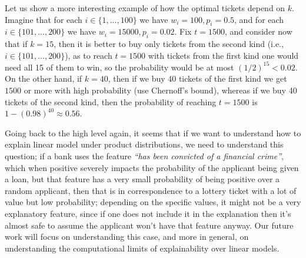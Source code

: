 Let us show a more interesting example of how the optimal tickets depend on $k$.
Imagine that for each $i \in \{1, ..., 100\}$ we have $w_i = 100, p_i = 0.5$, and for each $i \in \{101, ..., 200\}$ we have $w_i = 15000, p_i = 0.02$. Fix $t = 1500$, and consider now that if $k = 15$, then it is better to buy only tickets from the second kind (i.e., $i \in \{101, \ldots, 200\}$), as to reach $t=1500$ with tickets from the first kind one would need all 15 of them to win, so the probability would be at most $(1/2)^{15} < 0.02$.  On the other hand, if $k = 40$, then if we buy 40 tickets of the first kind we get $1500$ or more with high probability (use Chernoff's bound), whereas if we buy 40 tickets of the second kind, then the probability of reaching $t = 1500$ is $1 - (0.98)^{40} \approx 0.56$.

Going back to the high level again, it seems that if we want to understand how to explain linear model under product distributions, we need to understand this question; if a bank uses the feature \emph{``has been convicted of a financial crime''}, which when positive severely impacts the probability of the applicant being given a loan, but that feature has a very small probability of being positive over a random applicant, then that is in correspondence to a lottery ticket with a lot of value but low probability; depending on the specific values, it might not be a very explanatory feature, since if one does not include it in the explanation then it's almost safe to assume the applicant won't have that feature anyway. Our future work will focus on understanding this case, and more in general, on understanding the computational limits of explainability over linear models.